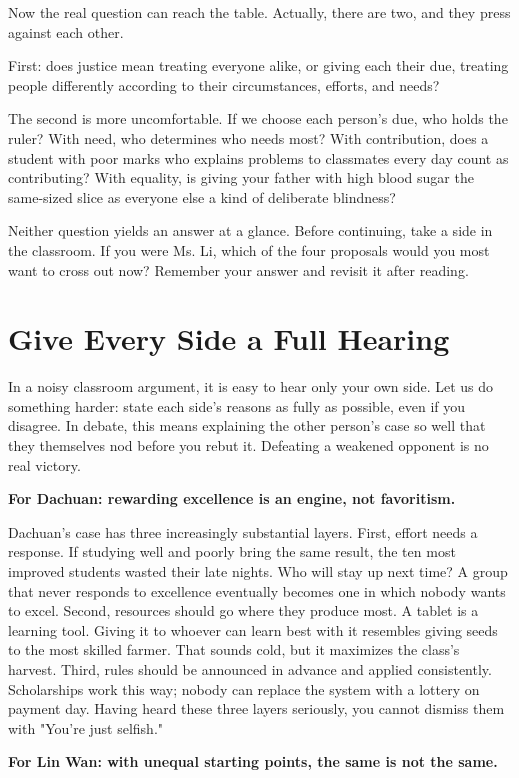 Now the real question can reach the table. Actually, there are two, and they press against each other.

First: does justice mean treating everyone alike, or giving each their due, treating people differently according to their circumstances, efforts, and needs?

The second is more uncomfortable. If we choose each person's due, who holds the ruler? With need, who determines who needs most? With contribution, does a student with poor marks who explains problems to classmates every day count as contributing? With equality, is giving your father with high blood sugar the same-sized slice as everyone else a kind of deliberate blindness?

Neither question yields an answer at a glance. Before continuing, take a side in the classroom. If you were Ms. Li, which of the four proposals would you most want to cross out now? Remember your answer and revisit it after reading.

\section{Give Every Side a Full Hearing}
In a noisy classroom argument, it is easy to hear only your own side. Let us do something harder: state each side's reasons as fully as possible, even if you disagree. In debate, this means explaining the other person's case so well that they themselves nod before you rebut it. Defeating a weakened opponent is no real victory.

\textbf{For Dachuan: rewarding excellence is an engine, not favoritism.}

Dachuan's case has three increasingly substantial layers. First, effort needs a response. If studying well and poorly bring the same result, the ten most improved students wasted their late nights. Who will stay up next time? A group that never responds to excellence eventually becomes one in which nobody wants to excel. Second, resources should go where they produce most. A tablet is a learning tool. Giving it to whoever can learn best with it resembles giving seeds to the most skilled farmer. That sounds cold, but it maximizes the class's harvest. Third, rules should be announced in advance and applied consistently. Scholarships work this way; nobody can replace the system with a lottery on payment day. Having heard these three layers seriously, you cannot dismiss them with "You're just selfish."

\textbf{For Lin Wan: with unequal starting points, the same is not the same.}

